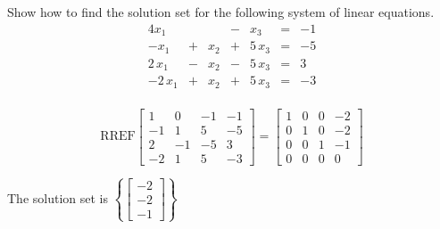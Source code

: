 
\begin{exerciseStatement}


Show how to find the solution set for the following system of linear equations. 
\begin{alignat*}{4} x_{1} & &  &-& x_{3} &=& -1 \\-x_{1} &+& x_{2} &+& 5 \, x_{3} &=& -5 \\2 \, x_{1} &-& x_{2} &-& 5 \, x_{3} &=& 3 \\-2 \, x_{1} &+& x_{2} &+& 5 \, x_{3} &=& -3 \\ \end{alignat*}
            


\end{exerciseStatement}
    
\begin{exerciseAnswer} 
\[\mathrm{RREF} \left[\begin{array}{ccc|c}
1 & 0 & -1 & -1 \\
-1 & 1 & 5 & -5 \\
2 & -1 & -5 & 3 \\
-2 & 1 & 5 & -3
\end{array}\right]  =  \left[\begin{array}{ccc|c}
1 & 0 & 0 & -2 \\
0 & 1 & 0 & -2 \\
0 & 0 & 1 & -1 \\
0 & 0 & 0 & 0
\end{array}\right] \]

The solution set is \( \left\{ \left[\begin{array}{c}
-2 \\
-2 \\
-1
\end{array}\right] \right\} \)


\end{exerciseAnswer}
    

